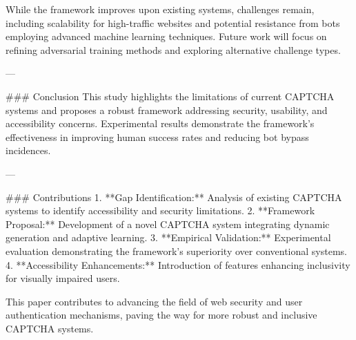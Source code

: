 While the framework improves upon existing systems, challenges remain, including scalability for high-traffic websites and potential resistance from bots employing advanced machine learning techniques. Future work will focus on refining adversarial training methods and exploring alternative challenge types.  

---

### Conclusion  
This study highlights the limitations of current CAPTCHA systems and proposes a robust framework addressing security, usability, and accessibility concerns. Experimental results demonstrate the framework's effectiveness in improving human success rates and reducing bot bypass incidences.  

---

### Contributions  
1. **Gap Identification:** Analysis of existing CAPTCHA systems to identify accessibility and security limitations.  
2. **Framework Proposal:** Development of a novel CAPTCHA system integrating dynamic generation and adaptive learning.  
3. **Empirical Validation:** Experimental evaluation demonstrating the framework's superiority over conventional systems.  
4. **Accessibility Enhancements:** Introduction of features enhancing inclusivity for visually impaired users.  

This paper contributes to advancing the field of web security and user authentication mechanisms, paving the way for more robust and inclusive CAPTCHA systems.  